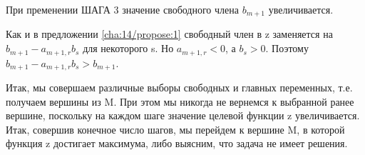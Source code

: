 \begin{propose}\label{cha:14/propose:4}
	При пременении ШАГА 3 значение свободного члена $b_{m+1}$ увеличивается.
\end{propose}
\begin{Proof}
	Как и в предложении \ref{cha:14/propose:1} свободный член в z заменяется на $b_{m+1} − a_{m+1,r} b_s$ для некоторого s. Но $a_{m+1,r} < 0$, а $b_s > 0$. Поэтому $b_{m+1} − a_{m+1,r}b_s > b_{m+1}$.
\end{Proof}

Итак, мы совершаем различные выборы свободных и главных переменных, т.е. получаем вершины из M. При этом мы никогда не вернемся к выбранной ранее вершине, поскольку на каждом шаге значение целевой функции z увеличивается. Итак, совершив конечное число шагов, мы перейдем к вершине M, в которой функция z достигает максимума, либо выясним, что задача не имеет решения.















